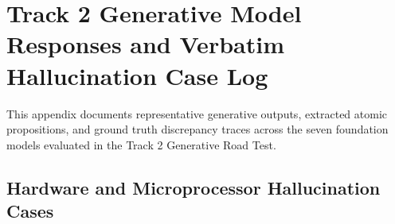 \chapter{Track 2 Generative Model Responses and Verbatim Hallucination Case Log}
\label{app:hallucination_cases}

This appendix documents representative generative outputs, extracted atomic propositions, and ground truth discrepancy traces across the seven foundation models evaluated in the Track 2 Generative Road Test.

\section{Hardware and Microprocessor Hallucination Cases}
\label{sec:app_hardware_cases}

